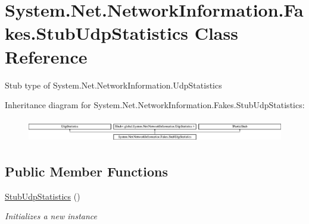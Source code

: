 \hypertarget{class_system_1_1_net_1_1_network_information_1_1_fakes_1_1_stub_udp_statistics}{\section{System.\-Net.\-Network\-Information.\-Fakes.\-Stub\-Udp\-Statistics Class Reference}
\label{class_system_1_1_net_1_1_network_information_1_1_fakes_1_1_stub_udp_statistics}
}


Stub type of System.\-Net.\-Network\-Information.\-Udp\-Statistics 


Inheritance diagram for System.\-Net.\-Network\-Information.\-Fakes.\-Stub\-Udp\-Statistics\-:\begin{figure}[H]
\begin{center}
\leavevmode
\includegraphics[height=1.037037cm]{class_system_1_1_net_1_1_network_information_1_1_fakes_1_1_stub_udp_statistics}
\end{center}
\end{figure}
\subsection*{Public Member Functions}
\begin{DoxyCompactItemize}
\item 
\hyperlink{class_system_1_1_net_1_1_network_information_1_1_fakes_1_1_stub_udp_statistics_a81c0107c188697861755bdc5ec4795c4}{Stub\-Udp\-Statistics} ()
\begin{DoxyCompactList}\small\item\em Initializes a new instance\end{DoxyCompactList}\end{DoxyCompactItemize}

